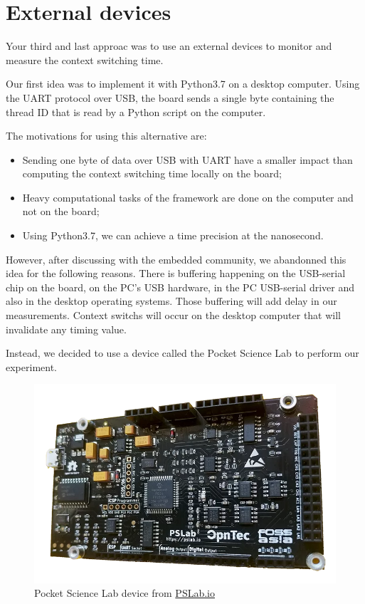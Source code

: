 \section{External devices}

Your third and last approac was to use an external devices to monitor and measure the context switching time.

Our first idea was to implement it with Python3.7 on a desktop computer.
Using the UART protocol over USB, the board sends a single byte containing the thread ID that is read by a Python script on the computer.

The motivations for using this alternative are:
\begin{itemize}
  \item Sending one byte of data over USB with UART have a smaller impact than computing the context switching time locally on the board;
  \item Heavy computational tasks of the framework are done on the computer and not on the board;
  \item Using Python3.7, we can achieve a time precision at the nanosecond.
\end{itemize}

However, after discussing with the embedded community, we abandonned this idea for the following reasons.
There is buffering happening on the USB-serial chip on the board, on the PC's USB hardware, in the PC USB-serial driver and also in the desktop operating systems.
Those buffering will add delay in our measurements.
Context switchs will occur on the desktop computer that will invalidate any timing value.

Instead, we decided to use a device called the Pocket Science Lab to perform our experiment.

\begin{figure}[!ht]
  \centering
  \includegraphics[scale=0.25]{assets/pslab.png}
  \caption{\label{fig:pslab}Pocket Science Lab device from \href{https://pslab.io}{PSLab.io}}
\end{figure}

